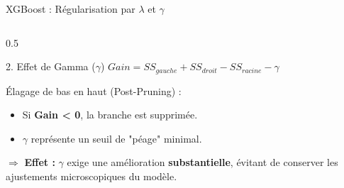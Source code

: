 \begin{frame}{XGBoost : Régularisation par $\lambda$ et $\gamma$}
\begin{columns}[T]
        \begin{column}{0.5\textwidth}
            \begin{block}{2. Effet de Gamma ($\gamma$)}
                \scriptsize
                $Gain = SS_{gauche} + SS_{droit} - SS_{racine} - \gamma$
                
                \vspace{0.1cm}
                Élagage de bas en haut (Post-Pruning) :
                \begin{itemize}
                    \setlength\itemsep{0em}
                    \item Si \textbf{Gain < 0}, la branche est supprimée.
                    \item $\gamma$ représente un seuil de "péage" minimal.
                \end{itemize}
                \vspace{0.1cm}
                $\Rightarrow$ \textbf{Effet :} $\gamma$ exige une amélioration \textbf{substantielle}, évitant de conserver les ajustements microscopiques du modèle.
            \end{block}
        \end{column}
    \end{columns}
\end{frame}

